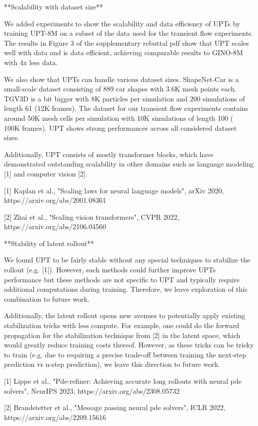 **Scalability with dataset size**

We added experiments to show the scalability and data efficiency of UPTs by training UPT-8M on a subset of the data used for the transient flow experiments. The results in Figure 3 of the supplementary rebuttal pdf show that UPT scales well with data and is data efficient, achieving comparable results to GINO-8M with 4x less data.

We also show that UPTs can handle various dataset sizes. ShapeNet-Car is a small-scale dataset consisting of 889 car shapes with 3.6K mesh points each. TGV3D is a bit bigger with 8K particles per simulation and 200 simulations of length 61 (12K frames). The dataset for our transient flow experiments contains around 50K mesh cells per simulation with 10K simulations of length 100 (~ 100K frames).
UPT shows strong performances across all considered dataset sizes.


Additionally, UPT consists of mostly transformer blocks, which have demonstrated outstanding scalability in other domains such as language modeling [1] and computer vision [2].


[1] Kaplan et al., "Scaling laws for neural language models", arXiv 2020, https://arxiv.org/abs/2001.08361


[2] Zhai et al., "Scaling vision transformers", CVPR 2022, https://arxiv.org/abs/2106.04560


**Stability of latent rollout**


We found UPT to be fairly stable without any special techniques to stabilize the rollout (e.g. [1]). However, such methods could further improve UPTs performance but these methods are not specific to UPT and typically require additional computations during training. Therefore, we leave exploration of this combination to future work.

Additionally, the latent rollout opens new avenues to potentially apply existing stabilization tricks with less compute. For example, one could do the forward propagation for the stabilization technique from [2] in the latent space, which would greatly reduce training costs thereof. However, as these tricks can be tricky to train (e.g. due to requiring a precise trade-off between training the next-step prediction vs n-step prediction), we leave this direction to future work.



[1] Lippe et al., "Pde-refiner: Achieving accurate long rollouts with neural pde solvers", NeurIPS 2023, https://arxiv.org/abs/2308.05732

[2] Brandstetter et al., "Message passing neural pde solvers", ICLR 2022, https://arxiv.org/abs/2209.15616

